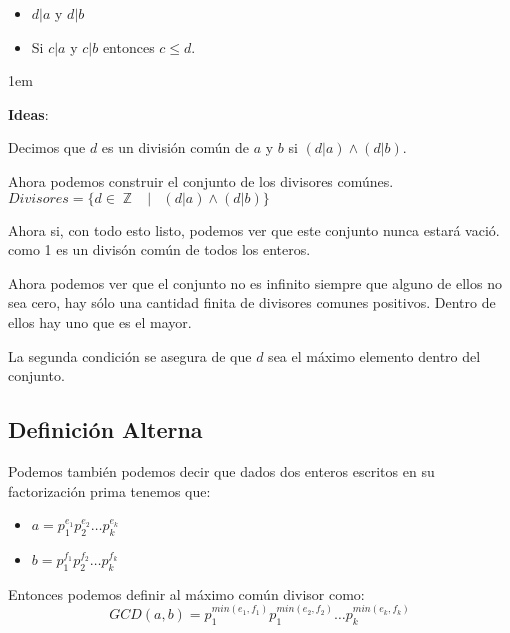 \documentclass[12pt, fleqn]{report}                             %
\newenvironment{SmallIndentation}[1][0.75em]                    %
    {\begin{adjustwidth}{#1}{}\begin{footnotesize}}                 %
    {\end{footnotesize}\end{adjustwidth}}                           %
\DeclareMathOperator \Space {\quad}                             %
\DeclareMathOperator \MiniSpace {\;}                            %
\newcommand \Such {\MiniSpace|\MiniSpace}                       %
\DeclareMathOperator \Integers  {\mathbb{Z}}                     %
\begin{document}
            \begin{itemize}
                \item $d|a$ y $d|b$
                \item Si $c|a$ y $c|b$ entonces $c \leq d$.
            \end{itemize}


            \begin{SmallIndentation}[1em]
                \textbf{Ideas}:

                Decimos que $d$ es un división común de $a$ y $b$ si $(d|a) \land (d|b)$.

                Ahora podemos construir el conjunto de los divisores comúnes.
                $Divisores = \{ d \in \Integers \Such (d|a) \land (d|b) \}$

                Ahora si, con todo esto listo, podemos ver que este conjunto nunca estará vació. 
                como 1 es un divisón común de todos los enteros.

                Ahora podemos ver que el conjunto no es infinito siempre que alguno de ellos no sea cero,
                hay sólo una cantidad finita de divisores comunes positivos. Dentro de ellos hay uno
                que es el mayor.

                La segunda condición se asegura de que $d$ sea el máximo elemento dentro del conjunto.

            \end{SmallIndentation}


        \subsection*{Definición Alterna}

            Podemos también podemos decir que dados dos enteros escritos en 
            su factorización prima tenemos que:
            \begin{itemize}
                \item $a = p_1^{e_1} p_2^{e_2} \dots p_k^{e_k}$
                \item $b = p_1^{f_1} p_2^{f_2} \dots p_k^{f_k}$
            \end{itemize}

            Entonces podemos definir al máximo común divisor como:
            \begin{equation}
                GCD(a, b) = p_1^{min(e_1, f_1)} p_1^{min(e_2, f_2)} \dots p_k^{min(e_k, f_k)}
            \end{equation}
\end{document}
